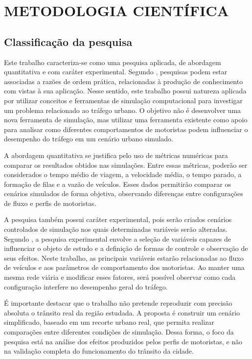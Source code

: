 \chapter{METODOLOGIA CIENTÍFICA}

\section{Classificação da pesquisa}

Este trabalho caracteriza-se como uma pesquisa aplicada, de abordagem quantitativa e com caráter experimental. Segundo , pesquisas podem estar associadas a razões de ordem prática, relacionadas à produção de conhecimento com vistas à sua aplicação. Nesse sentido, este trabalho possui natureza aplicada por utilizar conceitos e ferramentas de simulação computacional para investigar um problema relacionado ao tráfego urbano. O objetivo não é desenvolver uma nova ferramenta de simulação, mas utilizar uma ferramenta existente como apoio para analisar como diferentes comportamentos de motoristas podem influenciar o desempenho do tráfego em um cenário urbano simulado.

A abordagem quantitativa se justifica pelo uso de métricas numéricas para comparar os resultados obtidos nas simulações. Entre essas métricas, poderão ser considerados o tempo médio de viagem, a velocidade média, o tempo parado, a formação de filas e a vazão de veículos. Esses dados permitirão comparar os cenários simulados de forma objetiva, observando diferenças entre configurações de fluxo e perfis de motoristas.

A pesquisa também possui caráter experimental, pois serão criados cenários controlados de simulação nos quais determinadas variáveis serão alteradas. Segundo , a pesquisa experimental envolve a seleção de variáveis capazes de influenciar o objeto de estudo e a definição de formas de controle e observação de seus efeitos. Neste trabalho, as principais variáveis estarão relacionadas ao fluxo de veículos e aos parâmetros de comportamento dos motoristas. Ao manter uma mesma rede viária e modificar esses fatores, será possível observar como cada configuração interfere no desempenho geral do tráfego.

É importante destacar que o trabalho não pretende reproduzir com precisão absoluta o trânsito real da região estudada. A proposta é construir um cenário simplificado, baseado em um recorte urbano real, que permita realizar comparações entre diferentes condições de simulação. Dessa forma, o foco da pesquisa está na análise dos efeitos produzidos pelos perfis de motoristas, e não na validação completa do funcionamento do trânsito da cidade.

